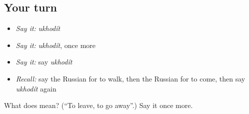 \subsection*{Your turn}
\begin{itemize}
\raggedright
  \item \emph{Say it:} \emph{ukhodít}
  \item \emph{Say it:} \emph{ukhodít}, once more
  \item \emph{Say it:} say \emph{ukhodít}
  \item \emph{Recall:} say the Russian for to walk, then the Russian for to come, then say \emph{ukhodít} again
\end{itemize}

\begin{tcolorbox}[breakable,colback=teal!4,colframe=teal!35!black,title={Before you move on}]
What does  mean? (\textquotedblleft{}To leave, to go away\textquotedblright{}.) Say it once more.
\end{tcolorbox}
